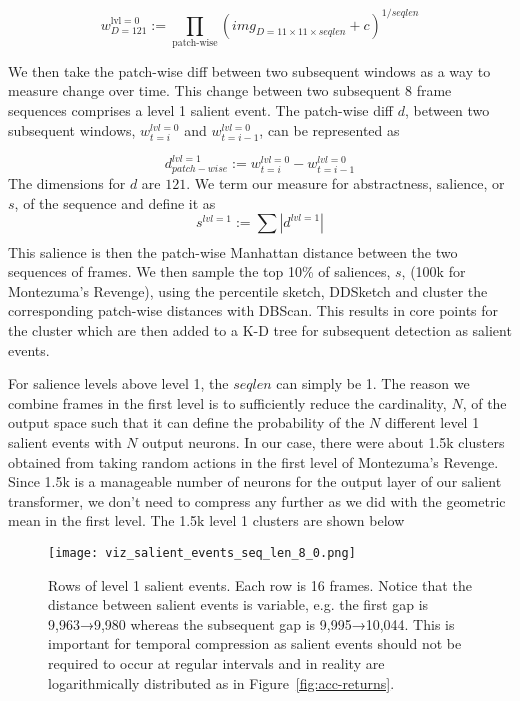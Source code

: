 \documentclass{article}
\begin{document}
\[
    w_{D=121}^{\text{lvl}=0} :=
    \prod_{\text{patch-wise}} \left(
        img_{D=11 \times 11\times seqlen} + c
    \right) ^ {1/seqlen}
\]


We then take the patch-wise diff between two subsequent windows as a way to measure change over time. This change between two subsequent 8 frame sequences comprises a level 1 salient event. The patch-wise diff $d$, between two subsequent windows, $w^{lvl=0}_{t=i}$ and $w^{lvl=0}_{t=i-1}$, can be represented as

\[
d^{lvl=1}_{patch-wise} :=  w^{lvl=0}_{t=i} - w^{lvl=0}_{t=i-1}
\]
The dimensions for $d$ are $121$. We term our measure for abstractness, salience, or $s$, of the sequence and define it as
\[
s^{lvl=1} := \sum_{} \left| d^{lvl=1} \right|
\]
This salience is then the patch-wise Manhattan distance between the two sequences of frames. We then sample the top 10\% of saliences,  $s$,  (100k for Montezuma's Revenge), using the percentile sketch, DDSketch \cite{Masson_2019} and cluster the corresponding patch-wise distances with DBScan\cite{ester1996density}. This results in core points for the cluster which are then added to a K-D tree \cite{bentley1975multidimensional} for subsequent detection as salient events.

For salience levels above level 1, the $seqlen$ can simply be 1. The reason we combine frames in the first level is to sufficiently reduce the cardinality, $N$, of the output space such that it can define the probability of the $N$ different level 1 salient events with $N$ output neurons. In our case, there were about 1.5k clusters obtained from taking random actions in the first level of Montezuma's Revenge. Since 1.5k is a manageable number of neurons for the output layer of our salient transformer, we don't need to compress any further as we did with the geometric mean in the first level. The 1.5k level 1 clusters are shown below
\begin{figure}
    \centering
    \texttt{[image: viz\_salient\_events\_seq\_len\_8\_0.png]}
    \caption{Rows of level 1 salient events. Each row is 16 frames. Notice that the distance between salient events is variable, e.g. the first gap is 9,963→9,980 whereas the subsequent gap is 9,995→10,044. This is important for temporal compression as salient events should not be required to occur at regular intervals and in reality \cite{kurzweil1999age} are logarithmically distributed as in Figure~\ref{fig:acc-returns}.
    }
    \label{fig:level-1-salient}
\end{figure}
\end{document}
